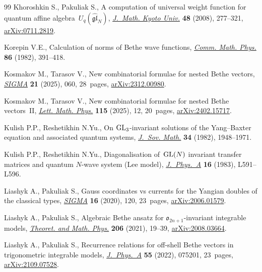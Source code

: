 \documentclass[10pt,a4paper]{amsart}
\theoremstyle{definition}
\begin{document}
\begin{thebibliography}{99}
Khoroshkin S., Pakuliak S., A computation of universal weight function for
 quantum affine algebra~{$U_q(\widehat{\mathfrak {gl}}_N)$},
 \href{https://doi.org/10.1215/kjm/1250271413}{\textit{J.~Math. Kyoto Univ.}}
 \textbf{48} (2008), 277--321,
 \href{http://arxiv.org/abs/0711.2819}{arXiv:0711.2819}.

Korepin V.E., Calculation of norms of {B}ethe wave functions,
 \href{https://doi.org/10.1007/BF01212176}{\textit{Comm. Math. Phys.}}
 \textbf{86} (1982), 391--418.

Kosmakov M., Tarasov V., New combinatorial formulae for nested {B}ethe vectors,
 \href{https://doi.org/10.3842/SIGMA.2025.060}{\textit{SIGMA}} \textbf{21}
 (2025), 060, 28~pages,
 \href{http://arxiv.org/abs/2312.00980}{arXiv:2312.00980}.

Kosmakov M., Tarasov V., New combinatorial formulae for nested {B}ethe
 vectors~{II}, \href{https://doi.org/10.1007/s11005-025-01896-2}{\textit{Lett.
 Math. Phys.}} \textbf{115} (2025), 12, 20~pages,
 \href{http://arxiv.org/abs/2402.15717}{arXiv:2402.15717}.

Kulish P.P., Reshetikhin N.Yu., On {${\rm GL}\sb{3}$}-invariant solutions of the
 {Y}ang--{B}axter equation and associated quantum systems,
 \href{https://doi.org/10.1007/BF01095104}{\textit{J.~Sov. Math.}} \textbf{34}
 (1982), 1948--1971.

Kulish P.P., Reshetikhin N.Yu., Diagonalisation of~{${\rm GL}(N)$} invariant
 transfer matrices and quantum {$N$}-wave system ({L}ee model),
 \href{https://doi.org/10.1088/0305-4470/16/16/001}{\textit{J.~Phys.~A}}
 \textbf{16} (1983), L591--L596.

Liashyk A., Pakuliak S., Gauss coordinates vs currents for the {Y}angian
 doubles of the classical types,
 \href{https://doi.org/10.3842/SIGMA.2020.120}{\textit{SIGMA}} \textbf{16}
 (2020), 120, 23~pages,
 \href{http://arxiv.org/abs/2006.01579}{arXiv:2006.01579}.

Liashyk A., Pakuliak S., Algebraic {B}ethe ansatz for {$\mathfrak
 o_{2n+1}$}-invariant integrable models,
 \href{https://doi.org/10.1134/S0040577921010025}{\textit{Theoret. and Math.
 Phys.}} \textbf{206} (2021), 19--39,
 \href{http://arxiv.org/abs/2008.03664}{arXiv:2008.03664}.

Liashyk A., Pakuliak S., Recurrence relations for off-shell {B}ethe vectors in
 trigonometric integrable models,
 \href{https://doi.org/10.1088/1751-8121/ac491b}{\textit{J.~Phys.~A}}
 \textbf{55} (2022), 075201, 23~pages,
 \href{http://arxiv.org/abs/2109.07528}{arXiv:2109.07528}.


\end{thebibliography}
\end{document}
